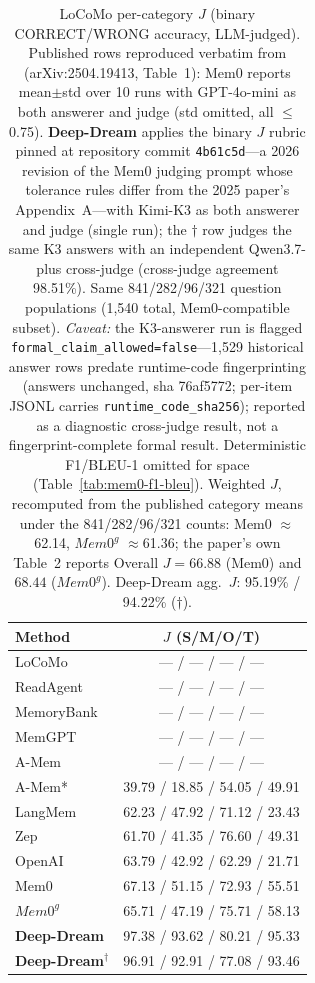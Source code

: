 \begin{table}[t]
\centering
\caption{LoCoMo per-category $J$ (binary CORRECT/WRONG accuracy, LLM-judged). Published rows reproduced verbatim from \citet{chhikara2025mem0} (arXiv:2504.19413, Table~1): Mem0 reports mean$\pm$std over 10 runs with GPT-4o-mini as both answerer and judge (std omitted, all $\leq$0.75). \textbf{Deep-Dream} applies the binary $J$ rubric pinned at repository commit \texttt{4b61c5d}---a 2026 revision of the Mem0 judging prompt whose tolerance rules differ from the 2025 paper's Appendix~A---with Kimi-K3 as both answerer and judge (single run); the $\dagger$ row judges the same K3 answers with an independent Qwen3.7-plus cross-judge (cross-judge agreement 98.51\%). Same 841/282/96/321 question populations (1{,}540 total, Mem0-compatible subset). \emph{Caveat:} the K3-answerer run is flagged \texttt{formal\_claim\_allowed=false}---1{,}529 historical answer rows predate runtime-code fingerprinting (answers unchanged, sha 76af5772; per-item JSONL carries \texttt{runtime\_code\_sha256}); reported as a diagnostic cross-judge result, not a fingerprint-complete formal result. Deterministic F1/BLEU-1 omitted for space (Table~\ref{tab:mem0-f1-bleu}). Weighted $J$, recomputed from the published category means under the 841/282/96/321 counts: Mem0 $\approx$62.14, $Mem0^g$ $\approx$61.36; the paper's own Table~2 reports Overall $J=66.88$ (Mem0) and $68.44$ ($Mem0^g$). Deep-Dream agg.\ $J$: 95.19\% / 94.22\% ($\dagger$).}
\label{tab:mem0-baselines}
\footnotesize
\setlength{\tabcolsep}{5pt}
\begin{tabular}{lc}
\toprule
Method & $J$ (S/M/O/T) \\
\midrule
LoCoMo & --- / --- / --- / --- \\
ReadAgent & --- / --- / --- / --- \\
MemoryBank & --- / --- / --- / --- \\
MemGPT & --- / --- / --- / --- \\
A-Mem & --- / --- / --- / --- \\
A-Mem* & 39.79 / 18.85 / 54.05 / 49.91 \\
LangMem & 62.23 / 47.92 / 71.12 / 23.43 \\
Zep & 61.70 / 41.35 / 76.60 / 49.31 \\
OpenAI & 63.79 / 42.92 / 62.29 / 21.71 \\
Mem0 & 67.13 / 51.15 / 72.93 / 55.51 \\
$Mem0^g$ & 65.71 / 47.19 / 75.71 / 58.13 \\
\textbf{Deep-Dream} & 97.38 / 93.62 / 80.21 / 95.33 \\
\textbf{Deep-Dream}$^\dagger$ & 96.91 / 92.91 / 77.08 / 93.46 \\
\bottomrule
\end{tabular}
\end{table}
